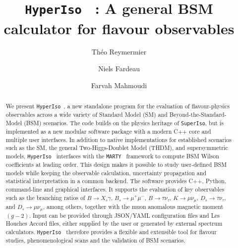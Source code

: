\documentclass[preprint,11pt]{elsarticle}
\newcommand{\hi}{\texttt{HyperIso}}
\newcommand{\spi}{\texttt{SuperIso}}
\newcommand{\mty}{\texttt{MARTY}}
\begin{document}
\begin{frontmatter}



\title{\hi~ : A general BSM
calculator for flavour
observables}


\author[a]{Théo Reymermier}
\author[a]{Niels Fardeau}
\author[a,b]{Farvah Mahmoudi}

\address[a]{Université Claude Bernard Lyon 1, CNRS/IN2P3, IP2I Lyon, UMR 5822, F-69622, Villeurbanne,
France}
\address[b]{Theoretical Physics Department, CERN, CH-1211 Geneva 23, Switzerland}

\begin{abstract}
We present \hi~, a new standalone program for the evaluation of flavour-physics observables across a wide variety of Standard Model (SM) and Beyond-the-Standard-Model (BSM) scenarios. The code builds on the physics heritage of \spi, but is implemented as a new modular software package with a modern C++ core and multiple user interfaces. In addition to native implementations for established scenarios such as the SM, the general Two-Higgs-Doublet Model (THDM), and supersymmetric models, \hi~ interfaces with the \mty~ framework to compute BSM Wilson coefficients at leading order. This design makes it possible to study user-defined BSM models while keeping the observable calculation, uncertainty propagation and statistical interpretation in a common backend. The software provides C++, Python, command-line and graphical interfaces. It supports the evaluation of key observables such as the branching ratios of \(B\to X_s\gamma\), \(B_s\to\mu^+\mu^-\), \(B\to\tau\nu_\tau\), \(K\to\mu\nu_\mu\), \(D_s\to\tau\nu_\tau\), and \(D_s\to\mu\nu_\mu\), among others, together with the muon anomalous magnetic moment \((g-2)\). Input can be provided through JSON/YAML configuration files and Les Houches Accord files, either supplied by the user or generated by external spectrum calculators. \hi~ therefore provides a flexible and extensible tool for flavour studies, phenomenological scans and the validation of BSM scenarios.
\end{abstract}


\end{frontmatter}
\end{document}
